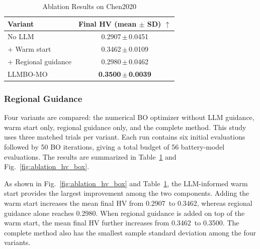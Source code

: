\documentclass[journal,10pt]{IEEEtran}
\newcommand{\AblationBaselineMean}{0.2907}
\newcommand{\AblationBaselineStd}{0.0451}
\newcommand{\AblationWarmMean}{0.3462}
\newcommand{\AblationWarmStd}{0.0109}
\newcommand{\AblationRegionMean}{0.2980}
\newcommand{\AblationRegionStd}{0.0462}
\newcommand{\AblationFullMean}{0.3500}
\newcommand{\AblationFullStd}{0.0039}
\begin{document}
\begin{table}[!t]

\caption{Ablation Results on Chen2020}

\label{tab:ablation}

\centering

\footnotesize

\setlength{\tabcolsep}{4.0pt}

\begin{tabular}{@{}lc@{}}

\toprule

Variant & Final HV (mean $\pm$ SD) $\uparrow$ \\

\midrule

No LLM & \AblationBaselineMean\,$\pm$\,\AblationBaselineStd \\

+ Warm start & \AblationWarmMean\,$\pm$\,\AblationWarmStd \\

+ Regional guidance & \AblationRegionMean\,$\pm$\,\AblationRegionStd \\

LLMBO-MO & \textbf{\AblationFullMean\,$\pm$\,\AblationFullStd} \\

\bottomrule

\end{tabular}

\end{table}

\subsubsection{Regional Guidance}

Four variants are compared: the numerical BO optimizer without LLM guidance,
warm start only, regional guidance only, and the complete method. This
study uses three matched trials per variant. Each run contains six initial
evaluations followed by 50 BO iterations, giving a total budget of 56
battery-model evaluations. The results are summarized in
Table~\ref{tab:ablation} and Fig.~\ref{fig:ablation_hv_box}.

As shown in Fig.~\ref{fig:ablation_hv_box} and Table~\ref{tab:ablation},
the LLM-informed warm start provides the largest improvement among the two
components. Adding the warm start increases the mean final HV from
\AblationBaselineMean\ to \AblationWarmMean, whereas regional guidance alone
reaches \AblationRegionMean. When regional guidance is added on top of the
warm start, the mean final HV further increases from
\AblationWarmMean\ to \AblationFullMean. The complete method also has the
smallest sample standard deviation among the four variants.
\end{document}
